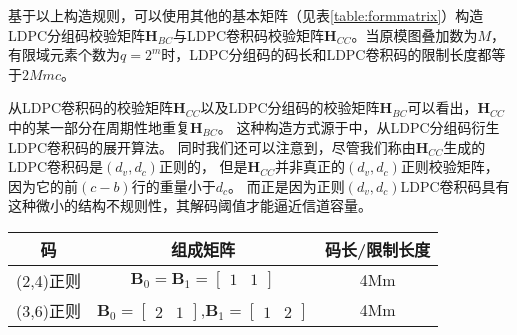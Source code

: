 基于以上构造规则，可以使用其他的基本矩阵（见表\ref{table:formmatrix}）构造LDPC分组码校验矩阵$\mathbf{H}_{BC}$与LDPC卷积码校验矩阵$\mathbf{H}_{CC}$。当原模图叠加数为$M$，有限域元素个数为$q=2^m$时，LDPC分组码的码长和LDPC卷积码的限制长度都等于$2Mmc$。

从LDPC卷积码的校验矩阵$\mathbf{H}_{CC}$以及LDPC分组码的校验矩阵$\mathbf{H}_{BC}$可以看出，$\mathbf{H}_{CC}$中的某一部分在周期性地重复$\mathbf{H}_{BC}$。
这种构造方式源于\parencite{782171}中，从LDPC分组码衍生LDPC卷积码的展开算法。
同时我们还可以注意到，尽管我们称由$\mathbf{H}_{CC}$生成的LDPC卷积码是$(d_v,d_c)$正则的，
但是$\mathbf{H}_{CC}$并非真正的$(d_v,d_c)$正则校验矩阵，因为它的前$(c-b)$行的重量小于$d_c$。
而正是因为正则$(d_v,d_c)$LDPC卷积码具有这种微小的结构不规则性，其解码阈值才能逼近信道容量。
\begin{center}
\label{table:formmatrix}
\begin{tabular}{c|c|c}
 \hline
码 & 组成矩阵 &码长/限制长度 \\ \hline
(2,4)正则 & 
$\mathbf{B}_0 = \mathbf{B}_1 = [\begin{array}{cc} 1&1 \end{array}]$ & 4Mm \\ \hline
(3,6)正则 & 
 $\mathbf{B}_0 = [\begin{array}{cc} 2&1 \end{array}]$,$\mathbf{B}_1 = [\begin{array}{cc} 1&2 \end{array}]$ & 4Mm \\ \hline
\end{tabular}
\end{center}